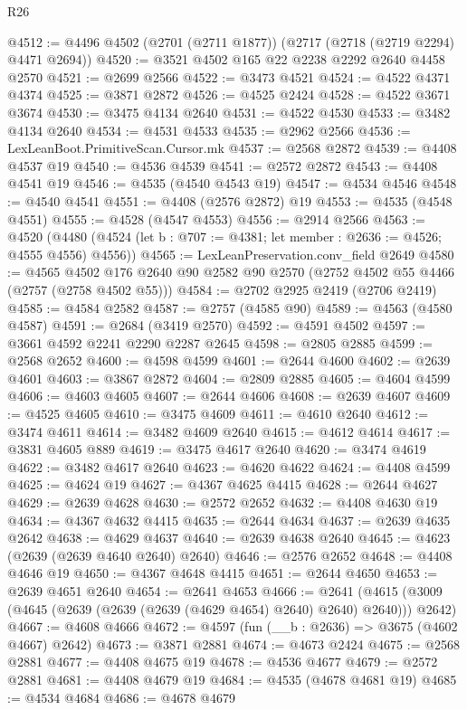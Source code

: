 \begin{lexlean}{R26}
\begin{coremodule}
@4512 := @4496 @4502 (@2701 (@2711 @1877)) (@2717 (@2718 (@2719 @2294) @4471 @2694))
@4520 := @3521 @4502 @165 @22 @2238 @2292 @2640 @4458 @2570
@4521 := @2699 @2566
@4522 := @3473 @4521
@4524 := @4522 @4371 @4374
@4525 := @3871 @2872
@4526 := @4525 @2424
@4528 := @4522 @3671 @3674
@4530 := @3475 @4134 @2640
@4531 := @4522 @4530
@4533 := @3482 @4134 @2640
@4534 := @4531 @4533
@4535 := @2962 @2566
@4536 := LexLeanBoot.PrimitiveScan.Cursor.mk
@4537 := @2568 @2872
@4539 := @4408 @4537 @19
@4540 := @4536 @4539
@4541 := @2572 @2872
@4543 := @4408 @4541 @19
@4546 := @4535 (@4540 @4543 @19)
@4547 := @4534 @4546
@4548 := @4540 @4541
@4551 := @4408 (@2576 @2872) @19
@4553 := @4535 (@4548 @4551)
@4555 := @4528 (@4547 @4553)
@4556 := @2914 @2566
@4563 := @4520
    (@4480 (@4524 (let b : @707 := @4381; let member : @2636 := @4526; @4555 @4556) @4556))
@4565 := LexLeanPreservation.conv_field @2649
@4580 := @4565
    @4502
    @176
    @2640
    @90
    @2582
    @90
    @2570
    (@2752 @4502 @55 @4466 (@2757 (@2758 @4502 @55)))
@4584 := @2702 @2925 @2419 (@2706 @2419)
@4585 := @4584 @2582
@4587 := @2757 (@4585 @90)
@4589 := @4563 (@4580 @4587)
@4591 := @2684 (@3419 @2570)
@4592 := @4591 @4502
@4597 := @3661 @4592 @2241 @2290 @2287 @2645
@4598 := @2805 @2885
@4599 := @2568 @2652
@4600 := @4598 @4599
@4601 := @2644 @4600
@4602 := @2639 @4601
@4603 := @3867 @2872
@4604 := @2809 @2885
@4605 := @4604 @4599
@4606 := @4603 @4605
@4607 := @2644 @4606
@4608 := @2639 @4607
@4609 := @4525 @4605
@4610 := @3475 @4609
@4611 := @4610 @2640
@4612 := @3474 @4611
@4614 := @3482 @4609 @2640
@4615 := @4612 @4614
@4617 := @3831 @4605 @889
@4619 := @3475 @4617 @2640
@4620 := @3474 @4619
@4622 := @3482 @4617 @2640
@4623 := @4620 @4622
@4624 := @4408 @4599
@4625 := @4624 @19
@4627 := @4367 @4625 @4415
@4628 := @2644 @4627
@4629 := @2639 @4628
@4630 := @2572 @2652
@4632 := @4408 @4630 @19
@4634 := @4367 @4632 @4415
@4635 := @2644 @4634
@4637 := @2639 @4635 @2642
@4638 := @4629 @4637
@4640 := @2639 @4638 @2640
@4645 := @4623 (@2639 (@2639 @4640 @2640) @2640)
@4646 := @2576 @2652
@4648 := @4408 @4646 @19
@4650 := @4367 @4648 @4415
@4651 := @2644 @4650
@4653 := @2639 @4651 @2640
@4654 := @2641 @4653
@4666 := @2641 (@4615 (@3009 (@4645 (@2639 (@2639 (@2639 (@4629 @4654) @2640) @2640) @2640))) @2642)
@4667 := @4608 @4666
@4672 := @4597 (fun (__b : @2636) => @3675 (@4602 @4667) @2642)
@4673 := @3871 @2881
@4674 := @4673 @2424
@4675 := @2568 @2881
@4677 := @4408 @4675 @19
@4678 := @4536 @4677
@4679 := @2572 @2881
@4681 := @4408 @4679 @19
@4684 := @4535 (@4678 @4681 @19)
@4685 := @4534 @4684
@4686 := @4678 @4679

\end{coremodule}
\end{lexlean}

